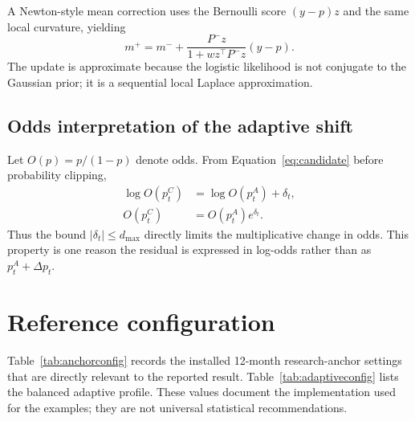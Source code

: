 \documentclass[11pt]{article}
\begin{document}
A Newton-style mean correction uses the Bernoulli score $(y-p)z$ and the same local curvature, yielding
\begin{equation}
m^+=m^-+\frac{P^-z}{1+wz^\top P^-z}(y-p).
\end{equation}
The update is approximate because the logistic likelihood is not conjugate to the Gaussian prior; it is a sequential local Laplace approximation.

\subsection{Odds interpretation of the adaptive shift}

Let $O(p)=p/(1-p)$ denote odds. From Equation~\eqref{eq:candidate} before probability clipping,
\begin{align}
\log O(p_t^C)&=\log O(p_t^A)+\delta_t,\\
O(p_t^C)&=O(p_t^A)e^{\delta_t}.
\end{align}
Thus the bound $|\delta_t|\le d_{\max}$ directly limits the multiplicative change in odds. This property is one reason the residual is expressed in log-odds rather than as $p_t^A+\Delta p_t$.

\section{Reference configuration}
\label{app:config}

Table~\ref{tab:anchorconfig} records the installed 12-month research-anchor settings that are directly relevant to the reported result. Table~\ref{tab:adaptiveconfig} lists the balanced adaptive profile. These values document the implementation used for the examples; they are not universal statistical recommendations.
\end{document}
